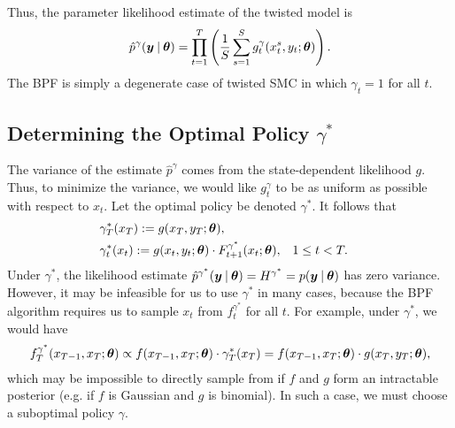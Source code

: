 \documentclass{article}
\begin{document}
Thus, the parameter likelihood estimate of the twisted model is 
\begin{align*}
\hat{p}^\gamma(\boldsymbol{y} \:\vert\: \boldsymbol{\theta}) = \prod_{t=1}^T \left(\frac{1}{S}\sum_{s=1}^S g^\gamma_t(x_t^s, y_t; \boldsymbol{\theta})\right). 
\end{align*}  
The BPF is simply a degenerate case of twisted SMC in which $\gamma_t = 1$ for all $t$.

\subsection{Determining the Optimal Policy $\gamma^*$}
The variance of the estimate $\hat{p}^\gamma$ comes from the state-dependent likelihood $g$.  Thus, to minimize the variance, we would like $g^\gamma_t$ to be as uniform as possible with respect to $x_t$.  Let the optimal policy be denoted $\gamma^*$.  It follows that 
\begin{align*}
& \gamma^*_T(x_T) := g(x_T, y_T; \boldsymbol{\theta}), \\
& \gamma^*_t(x_t) := g(x_t, y_t; \boldsymbol{\theta}) \cdot F^{\gamma^*}_{t+1}(x_t; \boldsymbol{\theta}), & & 1 \leq t < T.
\end{align*}  
Under $\gamma^*$, the likelihood estimate $\hat{p}^{\gamma^*}(\boldsymbol{y} \:\vert\: \boldsymbol{\theta}) = H^{\gamma^*} = p(\boldsymbol{y} \:\vert\: \boldsymbol{\theta})$ has zero variance.  However, it may be infeasible for us to use $\gamma^*$ in many cases, because the BPF algorithm requires us to sample $x_t$ from $f_t^{\gamma^*}$ for all $t$.  For example, under $\gamma^*$, we would have
\begin{align*}
f_T^{\gamma^*}(x_{T-1}, x_T; \boldsymbol{\theta}) \propto f(x_{T-1}, x_T; \boldsymbol{\theta}) \cdot \gamma^*_T(x_T) =  f(x_{T-1}, x_T; \boldsymbol{\theta}) \cdot g(x_T, y_T; \boldsymbol{\theta}), 
\end{align*}
which may be impossible to directly sample from if $f$ and $g$ form an intractable posterior (e.g. if $f$ is Gaussian and $g$ is binomial).  In such a case, we must choose a suboptimal policy $\gamma$.
\end{document}
